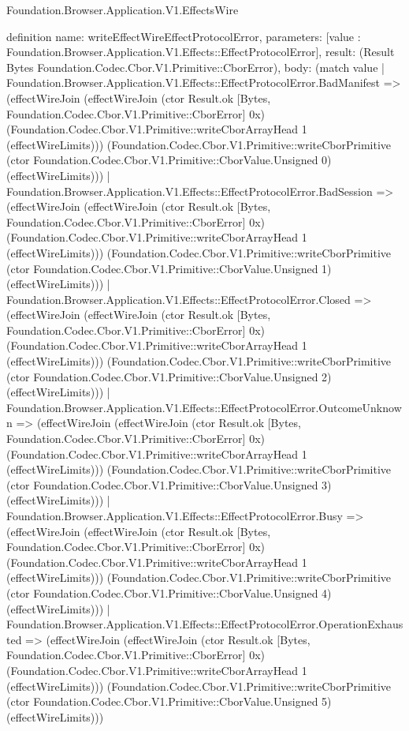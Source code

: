 \begin{lexlean}{Foundation.Browser.Application.V1.EffectsWire}
\begin{semanticmodule}
definition{
  name: writeEffectWireEffectProtocolError,
  parameters: [value : Foundation.Browser.Application.V1.Effects::EffectProtocolError],
  result: (Result Bytes Foundation.Codec.Cbor.V1.Primitive::CborError),
  body: (match value
    | Foundation.Browser.Application.V1.Effects::EffectProtocolError.BadManifest => (effectWireJoin (effectWireJoin (ctor Result.ok [Bytes, Foundation.Codec.Cbor.V1.Primitive::CborError] 0x) (Foundation.Codec.Cbor.V1.Primitive::writeCborArrayHead 1 (effectWireLimits))) (Foundation.Codec.Cbor.V1.Primitive::writeCborPrimitive (ctor Foundation.Codec.Cbor.V1.Primitive::CborValue.Unsigned 0) (effectWireLimits)))
    | Foundation.Browser.Application.V1.Effects::EffectProtocolError.BadSession => (effectWireJoin (effectWireJoin (ctor Result.ok [Bytes, Foundation.Codec.Cbor.V1.Primitive::CborError] 0x) (Foundation.Codec.Cbor.V1.Primitive::writeCborArrayHead 1 (effectWireLimits))) (Foundation.Codec.Cbor.V1.Primitive::writeCborPrimitive (ctor Foundation.Codec.Cbor.V1.Primitive::CborValue.Unsigned 1) (effectWireLimits)))
    | Foundation.Browser.Application.V1.Effects::EffectProtocolError.Closed => (effectWireJoin (effectWireJoin (ctor Result.ok [Bytes, Foundation.Codec.Cbor.V1.Primitive::CborError] 0x) (Foundation.Codec.Cbor.V1.Primitive::writeCborArrayHead 1 (effectWireLimits))) (Foundation.Codec.Cbor.V1.Primitive::writeCborPrimitive (ctor Foundation.Codec.Cbor.V1.Primitive::CborValue.Unsigned 2) (effectWireLimits)))
    | Foundation.Browser.Application.V1.Effects::EffectProtocolError.OutcomeUnknown => (effectWireJoin (effectWireJoin (ctor Result.ok [Bytes, Foundation.Codec.Cbor.V1.Primitive::CborError] 0x) (Foundation.Codec.Cbor.V1.Primitive::writeCborArrayHead 1 (effectWireLimits))) (Foundation.Codec.Cbor.V1.Primitive::writeCborPrimitive (ctor Foundation.Codec.Cbor.V1.Primitive::CborValue.Unsigned 3) (effectWireLimits)))
    | Foundation.Browser.Application.V1.Effects::EffectProtocolError.Busy => (effectWireJoin (effectWireJoin (ctor Result.ok [Bytes, Foundation.Codec.Cbor.V1.Primitive::CborError] 0x) (Foundation.Codec.Cbor.V1.Primitive::writeCborArrayHead 1 (effectWireLimits))) (Foundation.Codec.Cbor.V1.Primitive::writeCborPrimitive (ctor Foundation.Codec.Cbor.V1.Primitive::CborValue.Unsigned 4) (effectWireLimits)))
    | Foundation.Browser.Application.V1.Effects::EffectProtocolError.OperationExhausted => (effectWireJoin (effectWireJoin (ctor Result.ok [Bytes, Foundation.Codec.Cbor.V1.Primitive::CborError] 0x) (Foundation.Codec.Cbor.V1.Primitive::writeCborArrayHead 1 (effectWireLimits))) (Foundation.Codec.Cbor.V1.Primitive::writeCborPrimitive (ctor Foundation.Codec.Cbor.V1.Primitive::CborValue.Unsigned 5) (effectWireLimits)))
}
\end{semanticmodule}
\end{lexlean}
